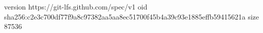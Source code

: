version https://git-lfs.github.com/spec/v1
oid sha256:c2e3c700df77f9a8c97382aa5aa8ec51700f45b4a39c93e1885effb59415621a
size 87536
